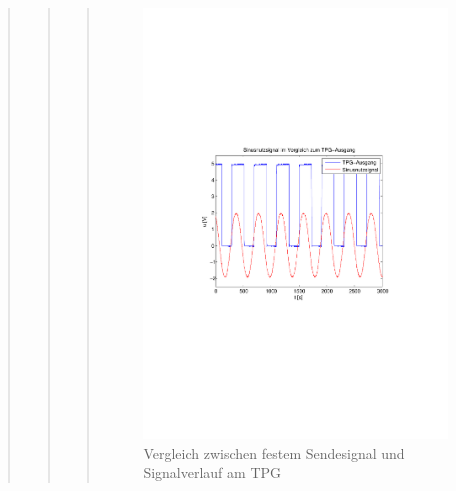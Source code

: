 \begin{quote}
\begin{quote}
\begin{quote}
             \begin{figure}[H] \centering
                    \includegraphics[scale=0.5, trim = 4cm 9.5cm 3.5cm 9.5cm,
                    clip]{./Bilder/sin_vs_tpg}
                        \caption{Vergleich zwischen festem Sendesignal und
                        Signalverlauf am TPG}
                \end{figure}
           
           
           

\end{quote}
\end{quote}
\end{quote}
